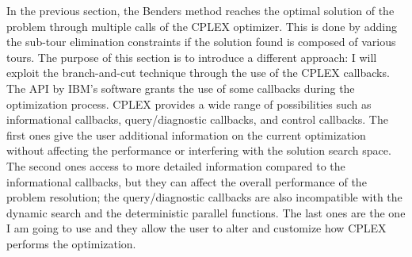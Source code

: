 In the previous section, the Benders method reaches the optimal solution of the problem through multiple calls of the CPLEX optimizer. This is done by adding the sub-tour elimination constraints if the solution found is composed of various tours. The purpose of this section is to introduce a different approach: I will exploit the branch-and-cut technique through the use of the CPLEX callbacks.\\
The API by IBM's software grants the use of some callbacks during the optimization process. CPLEX provides a wide range of possibilities such as informational callbacks, query/diagnostic callbacks, and control callbacks. The first ones give the user additional information on the current optimization without affecting the performance or interfering with the solution search space. The second ones access to more detailed information compared to the informational callbacks, but they can affect the overall performance of the problem resolution; the query/diagnostic callbacks are also incompatible with the dynamic search and the deterministic parallel functions.  The last ones are the one I am going to use and they allow the user to alter and customize how CPLEX performs the optimization.\\

